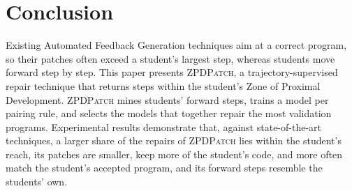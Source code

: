 \documentclass[conference]{IEEEtran}
\begin{document}
\section{Conclusion}
\label{sec:conclusion}
Existing Automated Feedback Generation techniques aim at a correct program, so their patches often exceed a student's largest step, whereas students move forward step by step. This paper presents \textsc{ZPDPatch}, a trajectory-supervised repair technique that returns steps within the student's Zone of Proximal Development. \textsc{ZPDPatch} mines students' forward steps, trains a model per pairing rule, and selects the models that together repair the most validation programs. Experimental results demonstrate that, against state-of-the-art techniques, a larger share of the repairs of \textsc{ZPDPatch} lies within the student's reach, its patches are smaller, keep more of the student's code, and more often match the student's accepted program, and its forward steps resemble the students' own.



\end{document}

